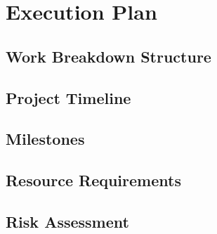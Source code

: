\chapter{Execution Plan}
\label{chapter_implementations}

\section{Work Breakdown Structure}
\section{Project Timeline}
\section{Milestones}
\section{Resource Requirements}
\section{Risk Assessment}